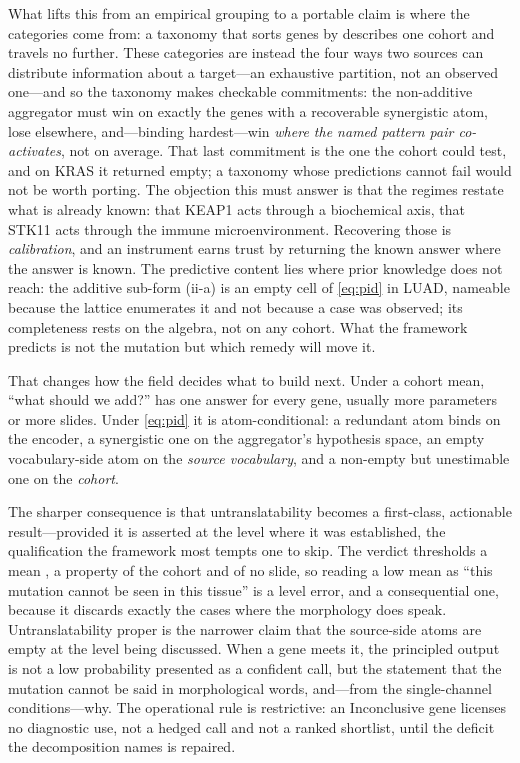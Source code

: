 What lifts this from an empirical grouping to a portable claim is where
the categories come from: a taxonomy that sorts genes by \auroc{}
describes one cohort and travels no further. These categories are
instead the four ways two sources can distribute information about a
target---an exhaustive partition, not an observed one---and so
the taxonomy makes checkable commitments: the
non-additive aggregator must win on exactly the genes with a recoverable
synergistic atom, lose elsewhere, and---binding
hardest---win \emph{where the named pattern pair co-activates}, not
on average. That last commitment is the one the cohort could test, and
on KRAS it returned empty; a taxonomy whose predictions cannot fail
would not be worth porting. The objection this must answer is that the regimes restate
what is already known: that KEAP1 acts through a biochemical axis, that
STK11 acts through the immune microenvironment. Recovering those is
\emph{calibration}, and an instrument earns trust
by returning the known answer where the answer is known. The predictive
content lies where prior knowledge does not reach: the additive sub-form
(ii-a) is an empty cell of \cref{eq:pid} in LUAD, nameable because the
lattice enumerates it and not because a case was observed; its
completeness rests on the algebra, not on any cohort. What the framework
predicts is not the mutation but which remedy will move it.

That changes how the field decides what to build next. Under a cohort
mean, ``what should we add?'' has one answer for every gene, usually
more parameters or more slides. Under \cref{eq:pid} it is
atom-conditional: a redundant atom binds on the encoder, a synergistic
one on the aggregator's hypothesis space, an empty vocabulary-side atom
on the \emph{source vocabulary}, and a non-empty but unestimable one on
the \emph{cohort}.

The sharper consequence is that untranslatability becomes a
first-class, actionable result---provided it is asserted at the level
where it was established, the qualification the framework most
tempts one to skip. The
verdict thresholds a mean \auroc{}, a property of the cohort and of no
slide, so reading a low mean as ``this mutation cannot be seen in this
tissue'' is a level error, and a consequential one, because it discards
exactly the cases where the morphology does speak.
Untranslatability proper is the narrower claim
that the source-side atoms are empty at the level being discussed. When a
gene meets it, the principled output is not a low probability presented
as a confident call, but the statement that the mutation cannot be said
in morphological words, and---from the single-channel conditions---why.
The operational rule
is restrictive: an Inconclusive gene licenses no
diagnostic use, not a hedged call and not a ranked shortlist, until the
deficit the decomposition names is repaired.

